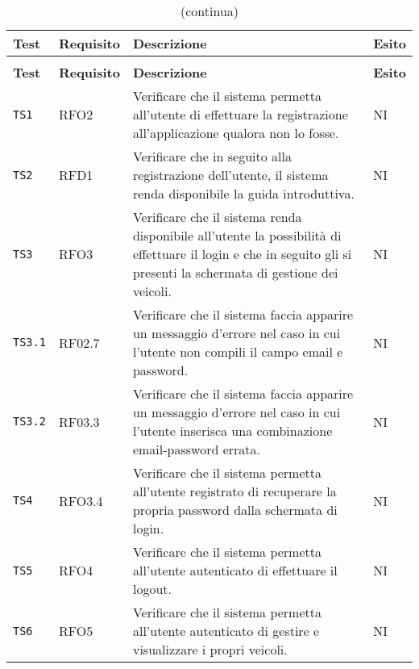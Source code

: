 	\begin{longtable}{ >{\centering}p{} >{\centering}p{} >{\centering}p{}
			>{\centering}p{}}%
			
		\caption{Riepilogo Test di Accettazione}\\	
		\rowcolorhead
		\textbf{\color{white}Test} 
		& \textbf{\color{white}Requisito} 
		& \textbf{\color{white}Descrizione} 
		& \centering\textbf{\color{white}Esito}
		\tabularnewline %
		\endfirsthead	
		
		\rowcolor{white}\caption[]{(continua)}\\	
		\rowcolorhead
		\textbf{\color{white}Test} 
		& \textbf{\color{white}Requisito} 
		& \textbf{\color{white}Descrizione} 
		& \centering\textbf{\color{white}Esito}
		\tabularnewline %
		\endhead	
		
		\texttt{TS1}	& RFO2 & Verificare che il sistema permetta all'utente di effettuare la registrazione all'applicazione qualora non lo fosse. &	NI	\tabularnewline
		
		 \texttt{TS2}	& RFD1 & Verificare che in seguito alla registrazione dell'utente, il sistema renda disponibile la guida introduttiva.	&	NI	\tabularnewline
		 
		 \texttt{TS3}	& RFO3 & Verificare che il sistema renda disponibile all'utente la possibilità di effettuare il login e che in seguito gli si presenti la schermata di gestione dei veicoli. &	NI	\tabularnewline
		 
		 \texttt{TS3.1} & RF02.7 & Verificare che il sistema faccia apparire un messaggio d'errore nel caso in cui l'utente non compili il campo email e password. &	NI	\tabularnewline
		 
		 \texttt{TS3.2} & RF03.3 &	Verificare che il sistema faccia apparire un messaggio d'errore nel caso in cui l'utente inserisca una combinazione email-password errata. &	NI	\tabularnewline
		 
		 \texttt{TS4} & RFO3.4	& Verificare che il sistema permetta all'utente registrato di recuperare la propria password dalla schermata di login.	&	NI	\tabularnewline
		 
		 \texttt{TS5}	& RFO4 & Verificare che il sistema permetta all'utente autenticato di effettuare il logout. &	 NI \tabularnewline
		  
		 \texttt{TS6}	& RFO5 & Verificare che il sistema permetta all'utente autenticato di gestire e visualizzare i propri veicoli.	&	NI	\tabularnewline
		  

\end{longtable}
